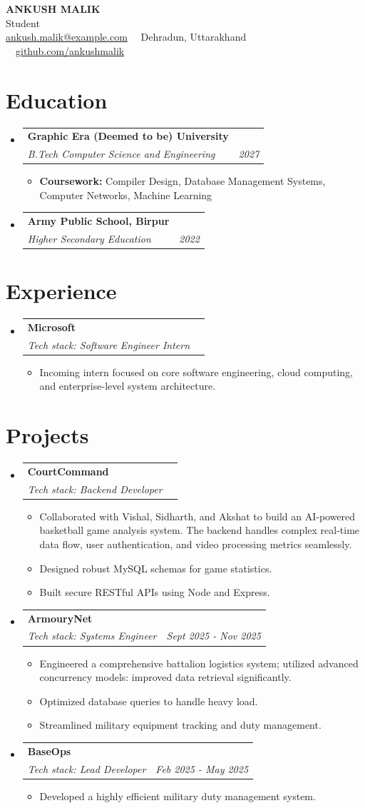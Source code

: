 \documentclass[letterpaper,11pt]{article}
\makeatletter
\newcommand{\resumeSubheading}[4]{
  \vspace{-1pt}\item
    \begin{tabular*}{0.97\textwidth}{l@{\extracolsep{\fill}}r}
      \textbf{#1} & \small #2 \\
      \textit{\small #3} & \textit{\small #4} \\
    \end{tabular*}\vspace{-5pt}
}
\newcommand{\resumeSubHeadingListStart}{%
  \begin{itemize}[leftmargin=*,label={}]}
\newcommand{\resumeSubHeadingListEnd}{\end{itemize}}
\newcommand{\resumeItemListStart}{%
  \begin{itemize}[leftmargin=1.5em,itemsep=1pt,parsep=0pt,topsep=3pt]}
\newcommand{\resumeItemListEnd}{\end{itemize}\vspace{-4pt}}
\newcommand{\resumeItemBullet}[1]{\item\small{#1}}
\makeatother
\begin{document}
\begin{center}
    {\Huge \textbf{ANKUSH MALIK}} \\[4pt]
    {\large Student} \\[6pt]
    \small \href{mailto:ankush.malik@example.com}{ankush.malik@example.com} \ \textemdash \ Dehradun, Uttarakhand \ \textemdash \ \href{https://github.com/ankushmalik}{github.com/ankushmalik}
\end{center}
\vspace{6pt}

\section{Education}
  \resumeSubHeadingListStart
    \resumeSubheading
      {Graphic Era (Deemed to be) University}{}
      {B.Tech Computer Science and Engineering}{2027}
    \resumeItemListStart
      \resumeItemBullet{\textbf{Coursework: } Compiler Design, Database Management Systems, Computer Networks, Machine Learning}
    \resumeItemListEnd
    \resumeSubheading
      {Army Public School, Birpur}{}
      {Higher Secondary Education}{2022}
  \resumeSubHeadingListEnd
\section{Experience}
  \resumeSubHeadingListStart
    \resumeSubheading
      {Microsoft}{}
      {Tech stack: Software Engineer Intern}{}
    \resumeItemListStart
      \resumeItemBullet{Incoming intern focused on core software engineering,  cloud computing, and enterprise-level system architecture.}
    \resumeItemListEnd
  \resumeSubHeadingListEnd
\section{Projects}
  \resumeSubHeadingListStart
    \resumeSubheading
      {CourtCommand}{}
      {Tech stack: Backend Developer}{}
    \resumeItemListStart
      \resumeItemBullet{Collaborated with Vishal, Sidharth, and Akshat to build an AI-powered basketball game analysis system. The backend handles complex real-time data flow, user authentication, and video processing metrics seamlessly.}
      \resumeItemBullet{Designed robust MySQL schemas for game statistics.}
      \resumeItemBullet{Built secure RESTful APIs using Node and Express.}
    \resumeItemListEnd
    \resumeSubheading
      {ArmouryNet}{}
      {Tech stack: Systems Engineer}{Sept 2025 - Nov 2025}
    \resumeItemListStart
      \resumeItemBullet{Engineered a comprehensive battalion logistics system; utilized advanced concurrency models: improved data retrieval significantly.}
      \resumeItemBullet{Optimized database queries to handle heavy load.}
      \resumeItemBullet{Streamlined military equipment tracking and duty management.}
    \resumeItemListEnd
    \resumeSubheading
      {BaseOps}{}
      {Tech stack: Lead Developer}{Feb 2025 - May 2025}
    \resumeItemListStart
      \resumeItemBullet{Developed a highly efficient military duty management system.}
    \resumeItemListEnd
  \resumeSubHeadingListEnd
\end{document}

